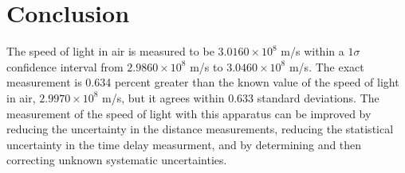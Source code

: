 \documentclass[%
 reprint,
 amsmath,amssymb,
 aps,
]{revtex4-2}
\begin{document}
\section{Conclusion}


The speed of light in air is measured to be $3.0160 \times 10^8$ m/s within a $1\sigma$ confidence interval from $2.9860 \times 10^8$ m/s to $3.0460 \times 10^8$ m/s. The exact measurement is 0.634 percent greater than the known value of the speed of light in air, $2.9970 \times 10^8$ m/s, but it agrees within 0.633 standard deviations. The measurement of the speed of light with this apparatus can be improved by reducing the uncertainty in the distance measurements, reducing the statistical uncertainty in the time delay measurment, and by determining and then correcting unknown systematic uncertainties.    


\end{document}
